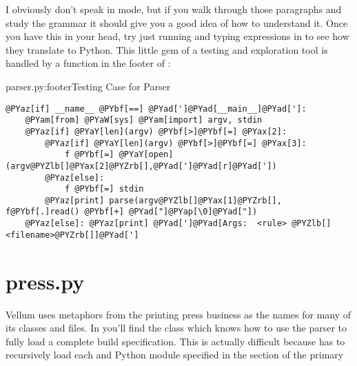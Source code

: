 I obviously don't speak in  mode, but if you walk through
those paragraphs and study the grammar it should give you a good idea of how to
understand it.  Once you have this in your head, try just running  and typing expressions in to see how they translate to
Python.  This little gem of a testing and exploration tool is handled by a
function in the footer of :

\begin{code}{parser.py:footer}{Testing Case for Parser}
\begin{Verbatim}[commandchars=@\[\]]
@PYaz[if] __name__ @PYbf[==] @PYad[']@PYad[__main__]@PYad[']:
    @PYam[from] @PYaW[sys] @PYam[import] argv, stdin
    @PYaz[if] @PYaY[len](argv) @PYbf[>]@PYbf[=] @PYax[2]:
        @PYaz[if] @PYaY[len](argv) @PYbf[>]@PYbf[=] @PYax[3]:
            f @PYbf[=] @PYaY[open](argv@PYZlb[]@PYax[2]@PYZrb[],@PYad[']@PYad[r]@PYad['])
        @PYaz[else]:
            f @PYbf[=] stdin
        @PYaz[print] parse(argv@PYZlb[]@PYax[1]@PYZrb[], f@PYbf[.]read() @PYbf[+] @PYad["]@PYap[\0]@PYad["])
    @PYaz[else]: @PYaz[print] @PYad[']@PYad[Args:  <rule> @PYZlb[]<filename>@PYZrb[]]@PYad[']
\end{Verbatim}

\end{code}


\section{press.py}

Vellum uses metaphors from the printing press business as the names for many of
its classes and files.  In  you'll find the  class
which knows how to use the parser to fully load a complete build specification.
This is actually difficult because  has to recursively load each
 and Python module specified in the  section of the
primary 

